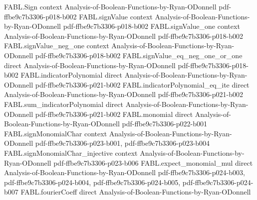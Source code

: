 \begin{theorem}
\label{FABL.fkn_small}
\leanok
{}
\proofstep
  {FABL.Sign}
  {context}
  {Analysis-of-Boolean-Functions-by-Ryan-ODonnell}
  {pdf-ffbe9c7b3306-p018-b002}
\proofstep
  {FABL.signValue}
  {context}
  {Analysis-of-Boolean-Functions-by-Ryan-ODonnell}
  {pdf-ffbe9c7b3306-p018-b002}
\proofstep
  {FABL.signValue_one}
  {context}
  {Analysis-of-Boolean-Functions-by-Ryan-ODonnell}
  {pdf-ffbe9c7b3306-p018-b002}
\proofstep
  {FABL.signValue_neg_one}
  {context}
  {Analysis-of-Boolean-Functions-by-Ryan-ODonnell}
  {pdf-ffbe9c7b3306-p018-b002}
\proofstep
  {FABL.signValue_eq_neg_one_or_one}
  {direct}
  {Analysis-of-Boolean-Functions-by-Ryan-ODonnell}
  {pdf-ffbe9c7b3306-p018-b002}
\proofstep
  {FABL.indicatorPolynomial}
  {direct}
  {Analysis-of-Boolean-Functions-by-Ryan-ODonnell}
  {pdf-ffbe9c7b3306-p021-b002}
\proofstep
  {FABL.indicatorPolynomial_eq_ite}
  {direct}
  {Analysis-of-Boolean-Functions-by-Ryan-ODonnell}
  {pdf-ffbe9c7b3306-p021-b002}
\proofstep
  {FABL.sum_indicatorPolynomial}
  {direct}
  {Analysis-of-Boolean-Functions-by-Ryan-ODonnell}
  {pdf-ffbe9c7b3306-p021-b002}
\proofstep
  {FABL.monomial}
  {direct}
  {Analysis-of-Boolean-Functions-by-Ryan-ODonnell}
  {pdf-ffbe9c7b3306-p022-b001}
\proofstep
  {FABL.signMonomialChar}
  {context}
  {Analysis-of-Boolean-Functions-by-Ryan-ODonnell}
  {pdf-ffbe9c7b3306-p023-b001,
    pdf-ffbe9c7b3306-p023-b004}
\proofstep
  {FABL.signMonomialChar_injective}
  {context}
  {Analysis-of-Boolean-Functions-by-Ryan-ODonnell}
  {pdf-ffbe9c7b3306-p023-b006}
\proofstep
  {FABL.expect_monomial_mul}
  {direct}
  {Analysis-of-Boolean-Functions-by-Ryan-ODonnell}
  {pdf-ffbe9c7b3306-p024-b003,
    pdf-ffbe9c7b3306-p024-b004,
    pdf-ffbe9c7b3306-p024-b005,
    pdf-ffbe9c7b3306-p024-b007}
\proofstep
  {FABL.fourierCoeff}
  {direct}
  {Analysis-of-Boolean-Functions-by-Ryan-ODonnell}

\end{theorem}
